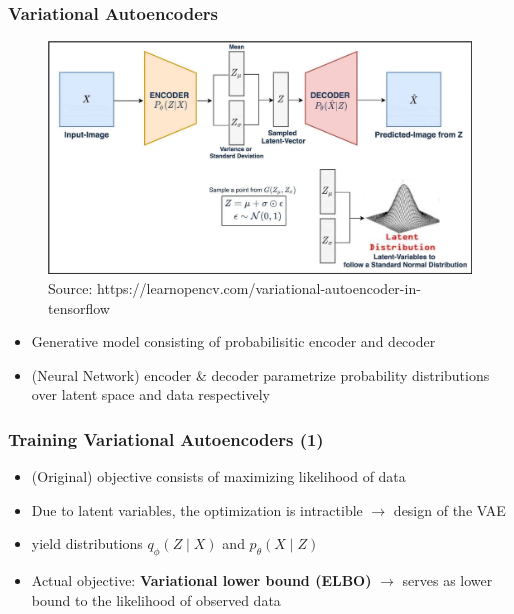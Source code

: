 \documentclass{beamer}
\theoremstyle{definition}
\begin{document}
    \begin{frame}
      \frametitle{Variational Autoencoders}
      \begin{figure}
        \includegraphics[scale=.125]{vae-diagram.jpg}
        \captionsetup{justification=centering}
        \caption*{\tiny{Source: https://learnopencv.com/variational-autoencoder-in-tensorflow}}
      \end{figure}
      \vspace{-5mm}
      \begin{itemize}
        \item Generative model consisting of probabilisitic encoder and decoder
        \item (Neural Network) encoder \& decoder parametrize probability distributions over latent space and data respectively
      \end{itemize}

    \end{frame}
    \begin{frame}
      \frametitle{Training Variational Autoencoders (1)}

      \begin{itemize}
        \item (Original) objective consists of maximizing likelihood of data
        \item Due to latent variables, the optimization is intractible $\rightarrow$ design of the VAE
        \item yield distributions  $q_{\phi}(Z \mid X)$ and $p_{\theta}(X \mid Z)$
        \item Actual objective: \textbf{Variational lower bound (ELBO)} $\rightarrow$ serves as lower bound to the likelihood of observed data
     \end{itemize}
    \end{frame}
\end{document}
